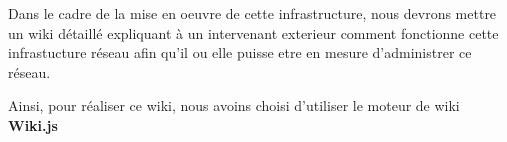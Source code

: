 \documentclass[../Livrable1.tex]{subfiles}
\begin{document}
Dans le cadre de la mise en oeuvre de cette infrastructure, nous devrons mettre un wiki détaillé expliquant à un intervenant exterieur comment fonctionne cette infrastucture réseau afin qu'il ou elle puisse etre en mesure d'administrer ce réseau.


Ainsi, pour réaliser ce wiki, nous avoins choisi d'utiliser le moteur de wiki \textbf{Wiki.js}
\end{document}
